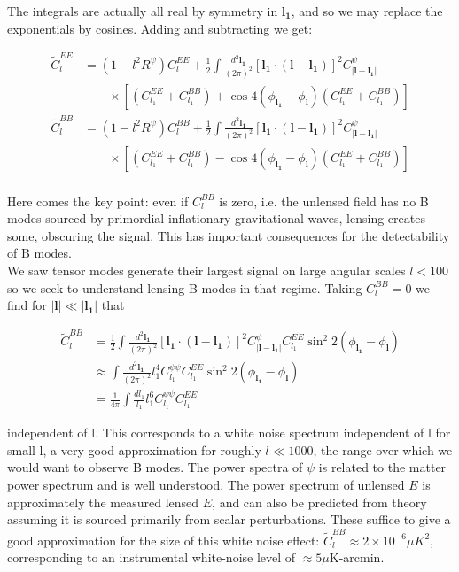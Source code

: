 \documentclass[a4paper,10pt]{article}
\renewcommand{\v}[1]{\mathbf{#1}}
\newcommand{\half}{\frac{1}{2}}
\newcommand{\finttwo}[1]{\int \frac{d^2 \v{#1}}{(2\pi)^2}}
\begin{document}
The integrals are actually all real by symmetry in $\v{l_1}$, and so we may replace the exponentials by cosines. Adding and subtracting we get:

\begin{equation}\begin{split}
\tilde{C}_l^{EE} &= (1-l^2R^\psi)C_l^{EE}+\half \finttwo{l_1}[ \v{l_1}\cdot(\v{l}-\v{l_1})]^2 C^\psi_{|\v{l}-\v{l_1}|}\\
&\qquad \times [(C_{l_1}^{EE}+C_{l_1}^{BB})+\cos{4(\phi_\v{l_1}-\phi_\v{l})}(C_{l_1}^{EE}+C_{l_1}^{BB})]\\
\tilde{C}_l^{BB} &= (1-l^2R^\psi)C_l^{BB}+\half \finttwo{l_1}[ \v{l_1}\cdot(\v{l}-\v{l_1})]^2 C^\psi_{|\v{l}-\v{l_1}|}\\
&\qquad \times [(C_{l_1}^{EE}+C_{l_1}^{BB})-\cos{4(\phi_\v{l_1}-\phi_\v{l})}(C_{l_1}^{EE}+C_{l_1}^{BB})]\\
\label{lensedBmodes}
\end{split}\end{equation}

Here comes the key point: even if $C_{l}^{BB}$ is zero, i.e. the unlensed field has no B modes sourced by primordial inflationary gravitational waves, lensing creates some, obscuring the signal. This has important consequences for the detectability of B modes.\\

We saw tensor modes generate their largest signal on large angular scales $l<100$ so we seek to understand lensing B modes in that regime. Taking $C_l^{BB}=0$ we find for $|\v{l}| \ll |\v{l_1}|$ that 

\begin{equation}\begin{split}
\tilde{C}_l^{BB} &= \half \finttwo{l_1}[ \v{l_1}\cdot(\v{l}-\v{l_1})]^2 C^\psi_{|\v{l}-\v{l_1}|}C_{l_1}^{EE}\sin^2{2(\phi_\v{l_1}-\phi_\v{l})}\\
&\approx \finttwo{l_1} l_1^4C^{\psi\psi}_{l_1}C^{EE}_{l_1}\sin^2{2(\phi_\v{l_1}-\phi_\v{l})}\\
&=\frac{1}{4\pi}\int \frac{dl_1}{l_1}l_1^6C^{\psi\psi}_{l_1}C^{EE}_{l_1}
\end{split}\end{equation}

independent of l. This corresponds to a white noise spectrum independent of l for small l, a very good approximation for roughly $l\ll 1000$, the range over which we would want to observe B modes. The power spectra of $\psi$ is related to the matter power spectrum and is well understood. The power spectrum of unlensed $E$ is approximately the measured lensed $E$, and can also be predicted from theory assuming it is sourced primarily from scalar perturbations. These suffice to give a good approximation for the size of this white noise effect: $\tilde{C}_l^{BB} \approx 2\times10^{-6}\mu K^2$, corresponding to an instrumental white-noise level of $\approx 5\mu$K-arcmin.\\
\end{document}
